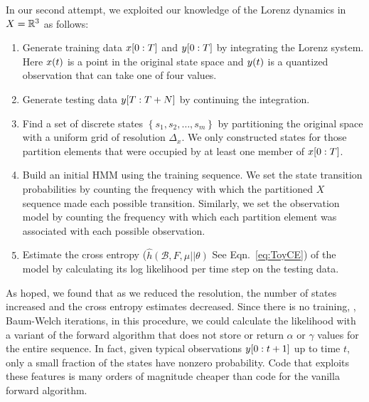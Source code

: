 In our second attempt, we exploited our knowledge of the Lorenz
dynamics in $X=\mathbb{R}^3$ as follows:
\begin{enumerate}
\item Generate training data $x[0:T]$ and $y[0:T]$ by
  integrating the Lorenz system.  Here ${x}{(t)}$ is a point in the
  original state space and ${y}{(t)}$ is a quantized observation that
  can take one of four values.
\item Generate testing data $y[T:T+N]$ by continuing the integration.
\item Find a set of discrete states $\left\{s_1, s_2, \ldots,
    s_m\right\}$ by partitioning the original space with a uniform
  grid of resolution $\Delta_x$.  We only constructed states for those
  partition elements that were occupied by at least one member of
  $x[0:T]$.
\item Build an initial HMM using the training sequence.  We set the
  state transition probabilities by counting the frequency with which
  the partitioned $X$ sequence made each possible transition.
  Similarly, we set the observation model by counting the frequency
  with which each partition element was associated with each possible
  observation.
\item Estimate the cross entropy ($ \hat h(\mathcal{B},F,\mu||\theta)$
  See Eqn.~\eqref{eq:ToyCE}) of the model by calculating its
  log likelihood per time step on the testing data.
\end{enumerate}

As hoped, we found that as we reduced the resolution, the number of
states increased and the cross entropy estimates decreased.  Since
there is no training, \ie, Baum-Welch iterations, in this procedure,
we could calculate the likelihood with a variant of the forward
algorithm that does not store or return $\alpha$ or $\gamma$ values
for the entire sequence.  In fact, given typical observations
$y[0:t+1]$ up to time $t$, only a small fraction of the states
have nonzero probability.  Code that exploits these features is many
orders of magnitude cheaper than code for the vanilla forward
algorithm.

